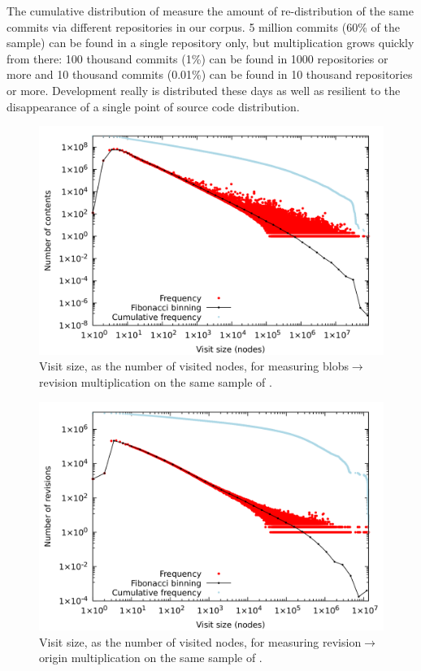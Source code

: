 The cumulative distribution of  measure
the amount of re-distribution of the same commits via different repositories in
our corpus. 5 million commits (60\% of the sample) can be found in a single
repository only, but multiplication grows quickly from there: 100 thousand
commits (1\%) can be found in 1000 repositories or more and 10 thousand commits
(0.01\%) can be found in 10 thousand repositories or more. Development really
is distributed these days as well as resilient to the disappearance of a single
point of source code distribution.

\begin{figure}
  \centering
  \includegraphics[width=0.7\linewidth]{img/compression/distributions/contents_node_size.png}
  \caption{Visit size, as the number of visited nodes, for measuring
    blobs$\to$revision multiplication on the same sample of
    .}%
  \label{fig:compression-size-cnt-rev}
\end{figure}

\begin{figure}
  \centering
  \includegraphics[width=0.7\linewidth]{img/compression/distributions/revisions_node_size.png}
  \caption{Visit size, as the number of visited nodes, for measuring
    revision$\to$origin multiplication on the same sample of
    .}%
  \label{fig:compression-size-rev-ori}
\end{figure}

